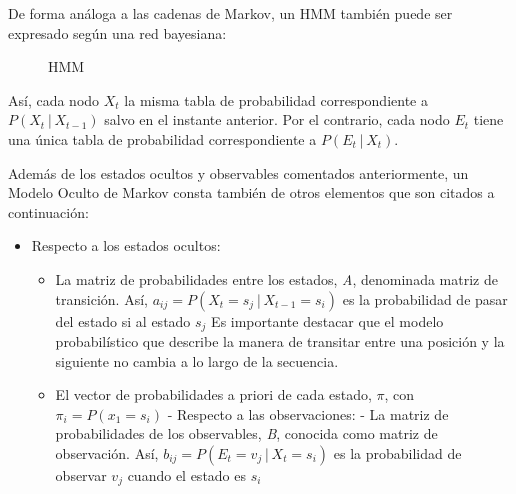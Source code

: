 \documentclass[
  a4paper,
  DIV=11,
  numbers=noendperiod]{scrreprt}
\providecommand{\tightlist}{%
  \setlength{\itemsep}{0pt}\setlength{\parskip}{0pt}}\usepackage{longtable,booktabs,array}
\begin{document}
De forma análoga a las cadenas de Markov, un HMM también puede ser
expresado según una red bayesiana:

\begin{figure}


\caption{\label{fig-hhm.jpg}HMM}

\end{figure}%

Así, cada nodo \(X_t\) la misma tabla de probabilidad correspondiente a
\(P(X_t│X_{t-1})\) salvo en el instante anterior. Por el contrario, cada
nodo \(E_t\) tiene una única tabla de probabilidad correspondiente a
\(P(E_t│X_t)\).

Además de los estados ocultos y observables comentados anteriormente, un
Modelo Oculto de Markov consta también de otros elementos que son
citados a continuación:

\begin{itemize}
\tightlist
\item
  Respecto a los estados ocultos:

  \begin{itemize}
  \tightlist
  \item
    La matriz de probabilidades entre los estados, \emph{A}, denominada
    matriz de transición. Así, \(a_{ij}=P(X_t=s_j│X_{t-1}=s_i)\) es la
    probabilidad de pasar del estado si al estado \(s_j\) Es importante
    destacar que el modelo probabilístico que describe la manera de
    transitar entre una posición y la siguiente no cambia a lo largo de
    la secuencia.
  \item
    El vector de probabilidades a priori de cada estado, \(\pi\), con
    \(\pi_i=P(x_1=s_i)\) - Respecto a las observaciones: - La matriz de
    probabilidades de los observables, \emph{B}, conocida como matriz de
    observación. Así, \(b_{ij}=P(E_t=v_j│X_t=s_i)\) es la probabilidad
    de observar \(v_j\) cuando el estado es \(s_i\)
  \end{itemize}
\end{itemize}
\end{document}
